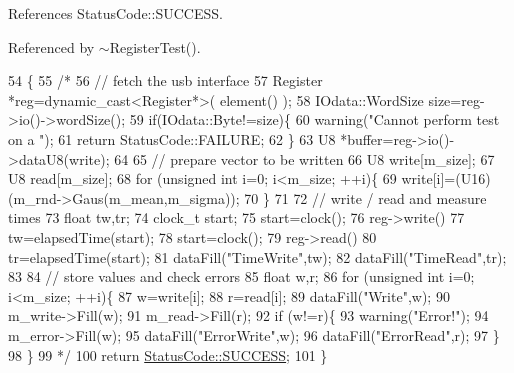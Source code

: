 References Status\+Code\+::\+S\+U\+C\+C\+E\+SS.



Referenced by $\sim$\+Register\+Test().


\begin{DoxyCode}
54                                    \{
55   \textcolor{comment}{/*}
56 \textcolor{comment}{  // fetch the usb interface
}
57 \textcolor{comment}{  Register *reg=dynamic\_cast<Register*>( element() );
}
58 \textcolor{comment}{  IOdata::WordSize size=reg->io()->wordSize();
}
59 \textcolor{comment}{  if(IOdata::Byte!=size)\{
}
60 \textcolor{comment}{    warning("Cannot perform test on a ");
}
61 \textcolor{comment}{    return StatusCode::FAILURE;
}
62 \textcolor{comment}{  \}
}
63 \textcolor{comment}{  U8 *buffer=reg->io()->dataU8(write);
}
64 \textcolor{comment}{}
65 \textcolor{comment}{  // prepare vector to be written
}
66 \textcolor{comment}{  U8 write[m\_size];
}
67 \textcolor{comment}{  U8 read[m\_size];
}
68 \textcolor{comment}{  for (unsigned int i=0; i<m\_size; ++i)\{
}
69 \textcolor{comment}{    write[i]=(U16)(m\_rnd->Gaus(m\_mean,m\_sigma));
}
70 \textcolor{comment}{  \}
}
71 \textcolor{comment}{}
72 \textcolor{comment}{  // write / read and measure times
}
73 \textcolor{comment}{  float tw,tr;
}
74 \textcolor{comment}{  clock\_t start;
}
75 \textcolor{comment}{  start=clock();
}
76 \textcolor{comment}{  reg->write()
}
77 \textcolor{comment}{  tw=elapsedTime(start);
}
78 \textcolor{comment}{  start=clock();
}
79 \textcolor{comment}{  reg->read()
}
80 \textcolor{comment}{  tr=elapsedTime(start);
}
81 \textcolor{comment}{  dataFill("TimeWrite",tw);
}
82 \textcolor{comment}{  dataFill("TimeRead",tr);
}
83 \textcolor{comment}{}
84 \textcolor{comment}{  // store values and check errors
}
85 \textcolor{comment}{  float w,r;
}
86 \textcolor{comment}{  for (unsigned int i=0; i<m\_size; ++i)\{
}
87 \textcolor{comment}{    w=write[i];
}
88 \textcolor{comment}{    r=read[i];
}
89 \textcolor{comment}{    dataFill("Write",w);
}
90 \textcolor{comment}{    m\_write->Fill(w);
}
91 \textcolor{comment}{    m\_read->Fill(r);
}
92 \textcolor{comment}{    if (w!=r)\{
}
93 \textcolor{comment}{      warning("Error!");
}
94 \textcolor{comment}{      m\_error->Fill(w);
}
95 \textcolor{comment}{      dataFill("ErrorWrite",w);
}
96 \textcolor{comment}{      dataFill("ErrorRead",r);
}
97 \textcolor{comment}{    \}
}
98 \textcolor{comment}{  \}
}
99 \textcolor{comment}{  */}
100   \textcolor{keywordflow}{return} \hyperlink{classStatusCode_a6f565cbeadc76d14c72f047e5e85eb4badd0da38d3ba0d922efd1f4619bc37ad8}{StatusCode::SUCCESS};
101 \}
\end{DoxyCode}
\mbox{\label{classObject_aad5a16aac7516ce65bd5ec02ab07fc80}} 
